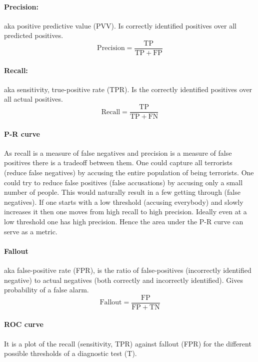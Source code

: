 \documentclass[12pt]{article}
\begin{document}
\paragraph{Precision: } aka positive predictive value (PVV). Is correctly identified positives over all predicted positives.
\[
\mathrm{Precision} = \frac{\mathrm{TP}}{\mathrm{ TP+FP}}
\]

\paragraph{Recall: }
aka sensitivity, true-positive rate (TPR). Is the correctly identified positives over all actual positives.
\[
\mathrm{Recall} = \mathrm{\frac{TP}{TP+FN}}
\]

\paragraph{P-R curve} As recall is a measure of false negatives and precision is a measure of false positives there is a tradeoff between them. One could capture all terrorists (reduce false negatives) by accusing the entire population of being terrorists. One could try to reduce false positives (false accusations) by accusing only a small number of people. This would naturally result in a few getting through (false negatives). If one starts with a low threshold (accusing everybody) and slowly increases it then one moves from high recall to high precision. Ideally even at a low threshold one has high precision. Hence the area under the P-R curve can serve as a metric. 


\paragraph{Fallout} aka false-positive rate (FPR), is the ratio of false-positives (incorrectly identified negative) to actual negatives (both correctly and incorrectly identified). Gives probability of a false alarm.
\[
\text{Fallout} = \mathrm{\frac{FP}{FP+TN}}
\]

\paragraph{ROC curve} It is a plot of the recall  (sensitivity, TPR) against fallout (FPR) for the different possible thresholds of a diagnostic test (T). 


\paragraph{}
\end{document}
